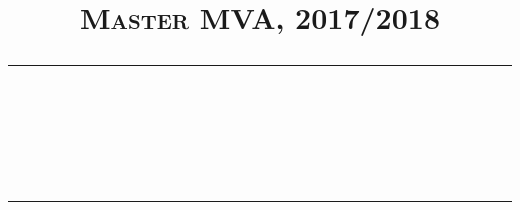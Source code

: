 \newcommand{\assignmenttitle}{}
\newcommand{\studentname}{}
\newcommand{\email}{}
\newcommand{\schoolyear}{2017/2018}


\title{
\normalfont \normalsize 
\textsc{Master MVA, \schoolyear} \\
\rule{\linewidth}{0.5pt} \\[6pt] 
\Large \assignmenttitle \\
\rule{\linewidth}{2pt} \vspace{-1cm}
}

\author{\studentname}

\date{\small\email}

\newcommand{\question}[1]{\subsubsection*{#1}}


\graphicspath{{images/}}

\newcommand{\labelnotempty}[1]{
\def\temp{#1}\ifx\temp\empty
\else
    \label{#1}
\fi
}
\newcommand{\singlefig}[4]{
\begin{figure}[ht!]
        \centering
        \texttt{[image: \#1]}
        \caption{#3}
        \labelnotempty{#4}
\end{figure}}

\newcommand{\subfig}[4]{
\texttt{[image: \#1]}
\caption{#3}
\labelnotempty{#4}
}

\newcommand{\doublefig}[4]{
\begin{figure}[ht!]
    \centering
    \begin{subfigure}[t]{0.45\columnwidth}
        \centering
    #1
    \end{subfigure}
    ~
    \begin{subfigure}[t]{0.45\columnwidth}
        \centering
    #2
    \end{subfigure}
    \caption{#3}
    \labelnotempty{#4}
\end{figure}}

\newcommand{\triplefig}[5]{
\begin{figure}[ht!]
    \centering
    \begin{subfigure}[t]{0.30\columnwidth}
        \centering
    #1
    \end{subfigure}
    ~
    \begin{subfigure}[t]{0.30\columnwidth}
        \centering
    #2
    \end{subfigure}
    ~
    \begin{subfigure}[t]{0.30\columnwidth}
        \centering
    #3
    \end{subfigure}
    \caption{#4}
    \labelnotempty{#5}
\end{figure}}

